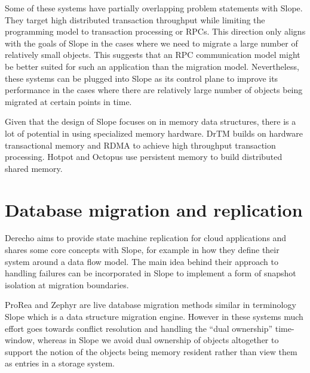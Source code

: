 Some of these systems have partially overlapping problem statements with
Slope. They target high distributed transaction throughput while limiting
the programming model to transaction processing or RPCs.
This direction only aligns with the goals of Slope in the cases where we
need to migrate a large number of relatively small objects. This suggests
that an RPC communication model might be better suited for such an
application than the migration model. Nevertheless, these systems
can be plugged into Slope as its control plane to improve its performance
in the cases where there are relatively large number of objects being
migrated at certain points in time.

Given that the design of Slope focuses on in memory data structures, there
is a lot of potential in using specialized memory hardware. DrTM
\cite{drtm2017} builds on hardware transactional memory and RDMA
to achieve high throughput transaction processing.
Hotpot \cite{Shan2017distributed} and Octopus \cite{Lu2017rdmadistributed}
use persistent memory to build distributed shared memory.


\section{Database migration and replication}
Derecho \cite{jha2019derecho} aims to provide state machine replication
for cloud applications and shares some core concepts with Slope, for
    example in how they define their system around a data flow model.
    The main idea behind their approach to handling failures can be
    incorporated in Slope to implement a form of snapshot isolation at
    migration boundaries.

ProRea \cite{ProRea2013} and Zephyr \cite{zephyr2011elmore} are live
database migration methods similar in terminology Slope which is a
data structure migration engine. However in these systems much effort goes
towards conflict resolution and handling the ``dual ownership''
time-window, whereas in Slope we avoid dual ownership of objects
altogether to support the notion of the objects being memory resident
rather than view them as entries in a storage system.
